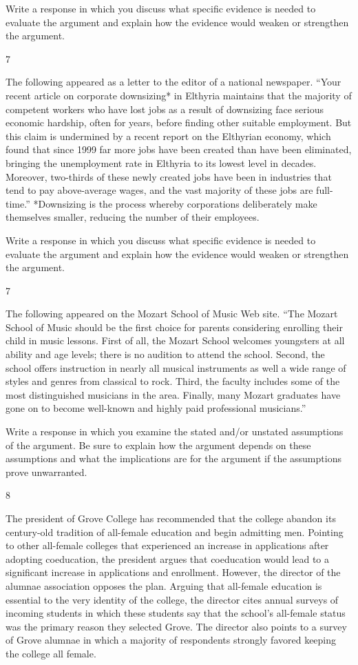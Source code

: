 \documentclass[]{article}
\begin{document}
Write a response in which you discuss what specific evidence is needed
to evaluate the argument and explain how the evidence would weaken or
strengthen the argument.

7

The following appeared as a letter to the editor of a national
newspaper. ``Your recent article on corporate downsizing* in Elthyria
maintains that the majority of competent workers who have lost jobs as a
result of downsizing face serious economic hardship, often for years,
before finding other suitable employment. But this claim is undermined
by a recent report on the Elthyrian economy, which found that since 1999
far more jobs have been created than have been eliminated, bringing the
unemployment rate in Elthyria to its lowest level in decades. Moreover,
two-thirds of these newly created jobs have been in industries that tend
to pay above-average wages, and the vast majority of these jobs are
full-time.'' *Downsizing is the process whereby corporations
deliberately make themselves smaller, reducing the number of their
employees.

Write a response in which you discuss what specific evidence is needed
to evaluate the argument and explain how the evidence would weaken or
strengthen the argument.

7

The following appeared on the Mozart School of Music Web site. ``The
Mozart School of Music should be the first choice for parents
considering enrolling their child in music lessons. First of all, the
Mozart School welcomes youngsters at all ability and age levels; there
is no audition to attend the school. Second, the school offers
instruction in nearly all musical instruments as well a wide range of
styles and genres from classical to rock. Third, the faculty includes
some of the most distinguished musicians in the area. Finally, many
Mozart graduates have gone on to become well-known and highly paid
professional musicians.''

Write a response in which you examine the stated and/or unstated
assumptions of the argument. Be sure to explain how the argument depends
on these assumptions and what the implications are for the argument if
the assumptions prove unwarranted.

8

The president of Grove College has recommended that the college abandon
its century-old tradition of all-female education and begin admitting
men. Pointing to other all-female colleges that experienced an increase
in applications after adopting coeducation, the president argues that
coeducation would lead to a significant increase in applications and
enrollment. However, the director of the alumnae association opposes the
plan. Arguing that all-female education is essential to the very
identity of the college, the director cites annual surveys of incoming
students in which these students say that the school's all-female status
was the primary reason they selected Grove. The director also points to
a survey of Grove alumnae in which a majority of respondents strongly
favored keeping the college all female.
\end{document}
